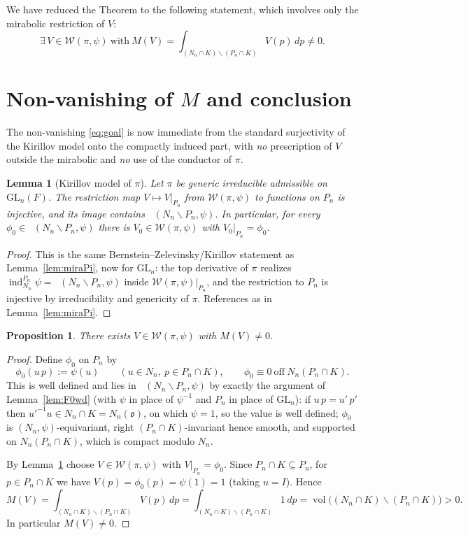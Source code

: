 \documentclass[12pt]{article}
\newcommand{\GL}{\mathrm{GL}}
\newcommand{\oo}{\mathfrak{o}}
\newcommand{\Wmod}{\mathcal{W}}
\DeclareMathOperator{\Cc}{C_c^\infty}
\newtheorem{lemma}{Lemma}
\newtheorem{proposition}{Proposition}
\begin{document}
We have reduced the Theorem to the following statement, which involves only the
mirabolic restriction of $V$:
\begin{equation}\label{eq:goal}
  \boxed{\ \exists\,V\in\Wmod(\pi,\psi)\ \text{with}\
  M(V)=\int_{(N_n\cap K)\backslash(P_n\cap K)}V(p)\,dp\neq0.\ }
\end{equation}

\section{Non-vanishing of $M$ and conclusion}

The non-vanishing \eqref{eq:goal} is now immediate from the standard surjectivity of
the Kirillov model onto the compactly induced part, with \emph{no} prescription of
$V$ outside the mirabolic and \emph{no} use of the conductor of $\pi$.

\begin{lemma}[Kirillov model of $\pi$]\label{lem:miraPiSmall}
Let $\pi$ be generic irreducible admissible on $\GL_n(F)$. The restriction map
$V\mapsto V|_{P_n}$ from $\Wmod(\pi,\psi)$ to functions on $P_n$ is injective, and
its image contains $\Cc(N_n\backslash P_n,\psi)$. In particular, for every
$\phi_0\in\Cc(N_n\backslash P_n,\psi)$ there is $V_0\in\Wmod(\pi,\psi)$ with
$V_0|_{P_n}=\phi_0$.
\end{lemma}

\begin{proof}
This is the same Bernstein--Zelevinsky/Kirillov statement as Lemma~\ref{lem:miraPi},
now for $\GL_n$: the top derivative of $\pi$ realizes
$\operatorname{ind}_{N_n}^{P_n}\psi=\Cc(N_n\backslash P_n,\psi)$ inside
$\Wmod(\pi,\psi)|_{P_n}$, and the restriction to $P_n$ is injective by irreducibility
and genericity of $\pi$. References as in Lemma~\ref{lem:miraPi}.
\end{proof}

\begin{proposition}\label{prop:nonvanish}
There exists $V\in\Wmod(\pi,\psi)$ with $M(V)\neq0$.
\end{proposition}

\begin{proof}
Define $\phi_0$ on $P_n$ by
\[
  \phi_0(u\,p):=\psi(u)\qquad(u\in N_n,\ p\in P_n\cap K),\qquad
  \phi_0\equiv0\ \text{off}\ N_n(P_n\cap K).
\]
This is well defined and lies in $\Cc(N_n\backslash P_n,\psi)$ by exactly the
argument of Lemma~\ref{lem:F0wd} (with $\psi$ in place of $\psi^{-1}$ and $P_n$ in
place of $\GL_n$): if $u\,p=u'\,p'$ then $u'^{-1}u\in N_n\cap K=N_n(\oo)$, on which
$\psi=1$, so the value is well defined; $\phi_0$ is $(N_n,\psi)$-equivariant, right
$(P_n\cap K)$-invariant hence smooth, and supported on $N_n(P_n\cap K)$, which is
compact modulo $N_n$.

By Lemma~\ref{lem:miraPiSmall} choose $V\in\Wmod(\pi,\psi)$ with $V|_{P_n}=\phi_0$.
Since $P_n\cap K\subseteq P_n$, for $p\in P_n\cap K$ we have $V(p)=\phi_0(p)=\psi(1)=1$
(taking $u=I$). Hence
\[
  M(V)=\int_{(N_n\cap K)\backslash(P_n\cap K)}V(p)\,dp
      =\int_{(N_n\cap K)\backslash(P_n\cap K)}1\,dp
      =\operatorname{vol}\bigl((N_n\cap K)\backslash(P_n\cap K)\bigr)>0 .
\]
In particular $M(V)\neq0$.
\end{proof}
\end{document}
